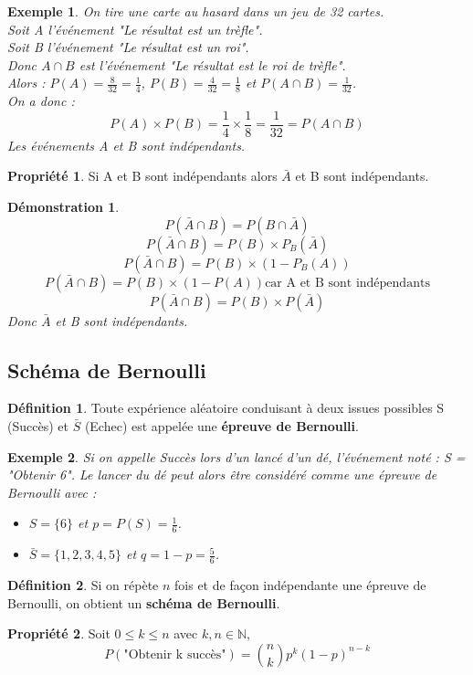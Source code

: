 \documentclass[a4paper,12pt]{article}
\newtheorem{Ex}{Exemple}[section]
\newtheorem{Proof}{Démonstration}[section]
\theoremstyle{theorem}
\theoremstyle{definition}
\newtheorem{Propriete}{Propriété}[section]
\theoremstyle{definition}
\theoremstyle{definition}
\newtheorem{Def}{Définition}[section]
\begin{document}
		\begin{Ex}
			On tire une carte au hasard dans un jeu de 32 cartes. \\
			Soit A l'événement "Le résultat est un trèfle". \\
			Soit B l'événement "Le résultat est un roi". \\
			Donc $A\cap B$ est l'événement "Le résultat est le roi de trèfle". \\
			Alors : $P(A) = \frac{8}{32} = \frac{1}{4}$, $P(B) = \frac{4}{32} = \frac{1}{8}$ et $P(A\cap B) = \frac{1}{32}$. \\
			On a donc : 
			\[P(A) \times P(B) = \frac{1}{4} \times \frac{1}{8} = \frac{1}{32} = P(A\cap B)\]
			Les événements A et B sont indépendants.
		\end{Ex}
	
		\begin{Propriete}
			Si A et B sont indépendants alors $\bar{A}$ et B sont indépendants.
		\end{Propriete}	
	
		\begin{Proof}
			\[P(\bar{A}\cap B) = P(B\cap \bar{A})\]
			\[P(\bar{A}\cap B) = P(B) \times P_{B}(\bar{A})\]
			\[P(\bar{A}\cap B) = P(B) \times (1 - P_{B}(A))\]
			\[P(\bar{A}\cap B) = P(B) \times (1 - P(A)) \text{car A et B sont indépendants}\]
			\[P(\bar{A}\cap B) = P(B) \times P(\bar{A})\]
			Donc $\bar{A}$ et B sont indépendants.
		\end{Proof}
	
	\subsection{Schéma de Bernoulli}
		\begin{Def}
			Toute expérience aléatoire conduisant à deux issues possibles S (Succès) et $\bar{S}$ (Echec) est appelée une \textbf{épreuve de Bernoulli}.
		\end{Def}
		\begin{Ex}
			Si on appelle Succès lors d'un lancé d'un dé, l'événement noté : S = "Obtenir 6". Le lancer du dé peut alors être considéré comme une épreuve de Bernoulli avec :\begin{itemize}
				\item $ S = \{6\}$ et $p = P(S) = \frac{1}{6}$.
				\item $\bar{S} = \{1,2,3,4,5\}$ et $q = 1-p = \frac{5}{6}$.
			\end{itemize}
		\end{Ex}
	
		\begin{Def}
			Si on répète $n$ fois et de façon indépendante une épreuve de Bernoulli, on obtient un \textbf{schéma de Bernoulli}.
		\end{Def}
	
		\begin{Propriete}
			Soit $0 \leq k \leq n$ avec $k,n \in \mathbb{N}$,
			\[P(\text{"Obtenir k succès"}) = \binom{n}{k}p^{k}(1-p)^{n-k}\]
		\end{Propriete}
	
\end{document}
